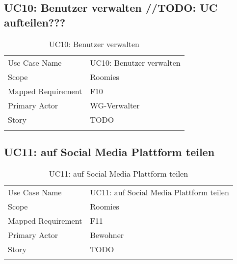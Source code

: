\subsection{UC10: Benutzer verwalten //TODO: UC aufteilen???}
\begin{table}[H]
	\tablestyle
	\tablealtcolored
	\begin{tabularx}{\textwidth}{lX}
		\tablebody
			Use Case Name &
			UC10: Benutzer verwalten
			\tabularnewline
			Scope &
			Roomies
			\tabularnewline
			Mapped Requirement &
			F10
			\tabularnewline
			Primary Actor &
			WG-Verwalter
			\tabularnewline
			Story &
			TODO
			\tabularnewline
		\tableend
	\end{tabularx}
	\caption{UC10: Benutzer verwalten}
\end{table}


\subsection{UC11: auf Social Media Plattform teilen}
\begin{table}[H]
	\tablestyle
	\tablealtcolored
	\begin{tabularx}{\textwidth}{lX}
		\tablebody
			Use Case Name &
			UC11: auf Social Media Plattform teilen
			\tabularnewline
			Scope &
			Roomies
			\tabularnewline
			Mapped Requirement &
			F11
			\tabularnewline
			Primary Actor &
			Bewohner
			\tabularnewline
			Story &
			TODO
			\tabularnewline
		\tableend
	\end{tabularx}
	\caption{UC11: auf Social Media Plattform teilen}
\end{table}
